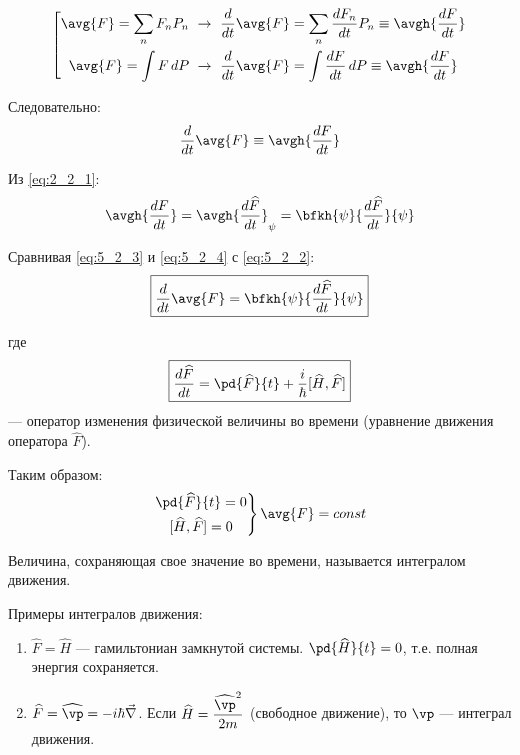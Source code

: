 $$
\left[
\begin{gathered}
\avg{F} = \sum_n F_n P_n ~\rightarrow~ \frac{d}{dt}\avg{F}=\sum_n \frac{dF_n}{dt}P_n \equiv \avgh{\frac{dF}{dt}}\\
\avg{F} = \int F\,dP ~\rightarrow~ \frac{d}{dt}\avg{F}=\int \frac{dF}{dt}\,dP \equiv \avgh{\frac{dF}{dt}}\\
\end{gathered}
\right.
$$

Следовательно:
\begin{equation}
\label{eq:5_2_3}
\frac{d}{dt} \avg{F} \equiv \avgh{\frac{dF}{dt}}
\end{equation}

Из \eqref{eq:2_2_1}:
\begin{equation}
\label{eq:5_2_4}
\avgh{\frac{dF}{dt}} = \avgh{\frac{d \widehat{F}}{dt}}_{\psi} = \bfkh{\psi}{\frac{d \widehat{F}}{dt}}{\psi}
\end{equation}

Сравнивая \eqref{eq:5_2_3} и \eqref{eq:5_2_4} с \eqref{eq:5_2_2}:
\begin{equation}
\label{eq:5_2_5}
\boxed{\frac{d}{dt} \avg{F} = \bfkh{\psi}{\frac{d \widehat{F}}{dt}}{\psi}}
\end{equation}

где
\begin{equation}
\label{eq:5_2_6}
\boxed{\frac{d\widehat{F}}{dt} = \pd{\widehat{F}}{t} + \frac{i}{\hbar} [\widehat{H}, \widehat{F}]}
\end{equation}
--- оператор изменения физической величины во времени (уравнение движения оператора $\widehat{F}$).

Таким образом:
$$
\left.
\begin{gathered}
\pd{\widehat{F}}{t}=0 \\
[\widehat{H}, \widehat{F}]=0
\end{gathered}
\right\} \avg{F}=const
$$

\begin{defn}
Величина, сохраняющая свое значение во времени, называется интегралом движения.
\end{defn}

Примеры интегралов движения:
\begin{enumerate}
\item $\widehat{F} = \widehat{H}$ --- гамильтониан замкнутой системы. $\pd{\widehat{H}}{t}=0$, т.е. полная энергия сохраняется.
\item $\widehat{F} = \widehat{\vp} = - i \hbar \vec{\nabla}$.  Если $\displaystyle\widehat{H} = \frac{\widehat{\vp}^2}{2m}$ (свободное движение), то $\vp$ --- интеграл движения.
\end{enumerate}

